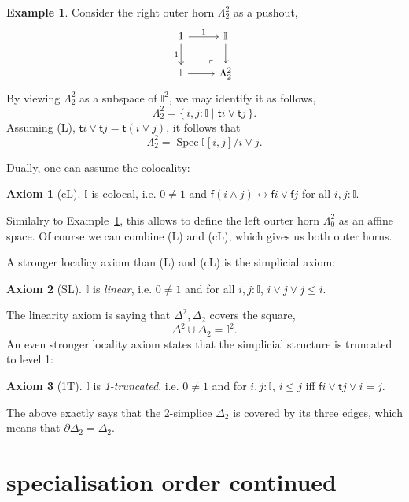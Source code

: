 \documentclass[12pt]{amsart}
\theoremstyle{definition}
\newtheorem{example}[theorem]{Example}
\newtheorem*{axiom}{Axiom}
\newcommand{\mbb}[1]{\mathbb{#1}}
\newcommand{\I}{\mbb I}
\newcommand{\ms}[1]{\mathsf{#1}}
\newcommand{\scomp}[2]{\{\,#1\mid#2\,\}}
\newcommand{\eq}{\leftrightarrow}
\newcommand{\spec}{\operatorname{Spec}}
\begin{document}
\begin{example}\label{exm:hornaffine}
  Consider the right outer horn $\Lambda^2_2$ as a pushout,
  \[
    \begin{tikzcd}
      1 \ar[d, "1"'] \ar[r, "1"] & \I \ar[d] \\
      \I \ar[r] & \Lambda^2_2
      \arrow["\lrcorner"{anchor=center, pos=0.125, rotate=180}, draw=none, from=2-2, to=1-1]
    \end{tikzcd}
  \]
  By viewing $\Lambda^2_2$ as a subspace of $\I^2$, we may identify it as follows,
  \[ \Lambda^2_2 = \scomp{i,j : \I}{\ms ti \vee \ms tj}. \]
  Assuming (L), $\ms ti \vee \ms tj = \ms t(i\vee j)$, it follows that 
  \[ \Lambda^2_2 = \spec \I[i,j]/i \vee j. \]
\end{example}

Dually, one can assume the colocality:

\begin{axiom}[cL]
  $\I$ is colocal, i.e. $0 \neq 1$ and $\ms f(i \wedge j) \eq \ms fi \vee \ms fj$ for all $i,j : \I$.
\end{axiom}

Similalry to Example~\ref{exm:hornaffine}, this allows to define the left ourter horn $\Lambda^2_0$ as an affine space. Of course we can combine (L) and (cL), which gives us both outer horns.

A stronger localicy axiom than (L) and (cL) is the simplicial axiom:

\begin{axiom}[SL]
  $\I$ is \emph{linear}, i.e. $0 \neq 1$ and for all $i,j : \I$, $i \vee j \vee j \le i$.
\end{axiom}

The linearity axiom is saying that $\Delta^2,\Delta_2$ covers the square,
\[ \Delta^2 \cup \Delta_2 = \I^2. \]
An even stronger locality axiom states that the simplicial structure is truncated to level 1:

\begin{axiom}[1T]
  $\I$ is \emph{1-truncated}, i.e. $0 \neq 1$ and for $i,j : \I$, $i \le j$ iff $\ms fi \vee \ms tj \vee i = j$.
\end{axiom}

The above exactly says that the 2-simplice $\Delta_2$ is covered by its three edges, which means that $\partial\Delta_2 = \Delta_2$.

\section{specialisation order continued}\label{sec:intposet}
\end{document}
